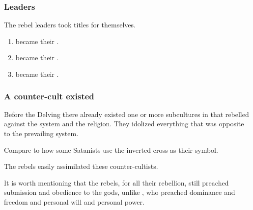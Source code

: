 \subsubsection{Leaders}
The rebel leaders took titles for themselves. 
\begin{enumerate}
  \item \Netzachirah became their .
  \item \Kezrabal became their .
  \item \Damiarch became their . 
\end{enumerate}






\subsubsection{A counter-cult existed}
Before the Delving there already existed one or more subcultures in \Merkyrah that rebelled against the system and the religion. 
They idolized everything that was opposite to the prevailing system. 

Compare to how some Satanists use the inverted cross as their symbol. 

  
The rebels easily assimilated these counter-cultists. 

It is worth mentioning that the \resphan rebels, for all their rebellion, still preached submission and obedience to the gods, unlike \Sethicus, who preached dominance and freedom and personal will and personal power. 

